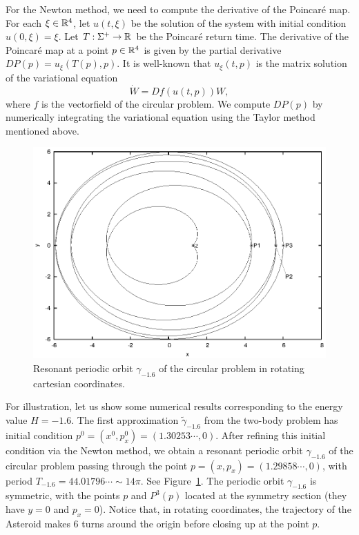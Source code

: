 For the Newton method, we need to compute the derivative of the Poincar\'e map.
For each $\xi\in \mathbb{R}^4$, let $u(t,\xi)$ be the solution of the system with
initial condition $u(0,\xi)=\xi$.
Let $T:\Sigma^+\to \mathbb{R}$ be the Poincar\'e return time.
The derivative of the Poincar\'e map at a point $p\in \mathbb{R}^4$ is given by
the partial derivative $DP(p)=u_\xi(T(p),p)$.
It is well-known that $u_\xi(t,p)$ is the matrix solution of the
variational equation
\[ \dot W = Df(u(t,p))W, \]
where $f$ is the vectorfield of the circular problem.
We compute $DP(p)$ by numerically integrating the variational
equation using the Taylor method mentioned above. 

\begin{figure}{}
\includegraphics{figs/trtbp}
\caption{Resonant periodic orbit $\gamma_{-1.6}$ of the circular
problem in rotating cartesian coordinates.}
\label{fig:trtbp}
\end{figure}

For illustration, let us show some numerical results corresponding to
the energy value $H=-1.6$.
The first approximation $\tilde \gamma_{-1.6}$ from the two-body
problem has initial condition $p^0=(x^0,p_x^0)=(1.30253\cdots,0)$.
After refining this initial condition via the Newton method, we obtain
a resonant periodic orbit $\gamma_{-1.6}$ of the circular problem passing
through the point $p=(x,p_x)=(1.29858\cdots,0)$, with period
$T_{-1.6}=44.01796\cdots \sim 14\pi$. See Figure~\ref{fig:trtbp}. 
The periodic orbit $\gamma_{-1.6}$ is symmetric, with the points $p$
and $P^3(p)$ located at the symmetry section (they have $y=0$ and $p_x=0$).
Notice that, in rotating coordinates, the trajectory of the Asteroid
makes 6 turns around the origin before closing up at the point $p$.

